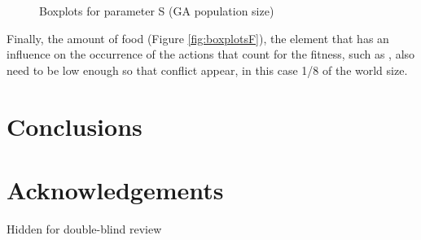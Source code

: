 \documentclass[runningheads,a4paper]{llncs}
\begin{document}
\begin{figure}
        \centering
        \caption{Boxplots for parameter S (GA population size)}\label{fig:boxplotsS}
\end{figure}

Finally, the amount of food (Figure \ref{fig:boxplotsF}), the
element that has an influence on the occurrence of the actions that
count for the fitness, such as %
, also need to be low enough so that conflict appear, in this case 1/8
of the world size. %















\section{Conclusions}



\section*{Acknowledgements}

Hidden for double-blind review



\end{document}
